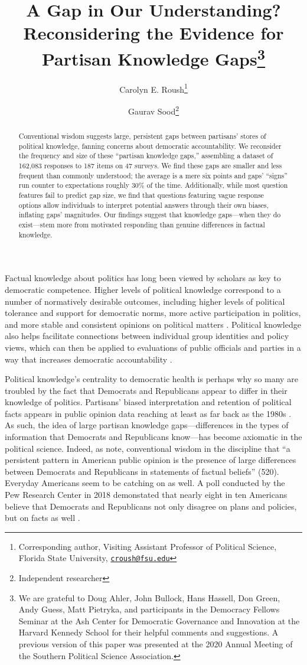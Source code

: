 \documentclass[12pt, letterpaper]{article}
\title{A Gap in Our Understanding? Reconsidering the Evidence for Partisan Knowledge Gaps\footnote{We are grateful to Doug Ahler, John Bullock, Hans Hassell, Don Green, Andy Guess, Matt Pietryka, and participants in the Democracy Fellows Seminar at the Ash Center for Democratic Governance and Innovation at the Harvard Kennedy School for their helpful comments and suggestions. A previous version of this paper was presented at the 2020 Annual Meeting of the Southern Political Science Association.}}
\author{Carolyn E. Roush\thanks{Corresponding author, Visiting Assistant Professor of Political Science, Florida State University, \href{mailto:croush@fsu.edu}{\texttt{croush@fsu.edu}}} \and Gaurav Sood\thanks{Independent researcher}}
\begin{document}
\maketitle
\thispagestyle{empty}

\begin{abstract}

\noindent Conventional wisdom suggests large, persistent gaps between partisans' stores of political knowledge, fanning concerns about democratic accountability. We reconsider the frequency and size of these ``partisan knowledge gaps,'' assembling a dataset of 162,083 responses to 187 items on 47 surveys. We find these gaps are smaller and less frequent than commonly understood; the average is a mere six points and gaps' ``signs'' run counter to expectations roughly 30\% of the time. Additionally, while most question features fail to predict gap size, we find that questions featuring vague response options allow individuals to interpret potential answers through their own biases, inflating gaps' magnitudes. Our findings suggest that knowledge gaps---when they do exist---stem more from motivated responding than genuine differences in factual knowledge.

\end{abstract}

\vspace{.2in}

\newpage

\doublespacing

Factual knowledge about politics has long been viewed by scholars as key to democratic competence. Higher levels of political knowledge correspond to a number of normatively desirable outcomes, including higher levels of political tolerance and support for democratic norms, more active participation in politics, and more stable and consistent opinions on political matters \citep{Converse1964,dellicarpini,galston_2001}. Political knowledge also helps facilitate connections between individual group identities and policy views, which can then be applied to evaluations of public officials and parties in a way that increases democratic accountability \citep{dellicarpini}.

Political knowledge's centrality to democratic health is perhaps why so many are troubled by the fact that Democrats and Republicans appear to differ in their knowledge of politics. Partisans' biased interpretation and retention of political facts appears in public opinion data reaching at least as far back as the 1980s \citep[e.g.,][]{bartels_2002,jerit2012partisan}. As such, the idea of large partisan knowledge gaps---differences in the types of information that Democrats and Republicans know---has become axiomatic in the political science. Indeed, as \citet{bullocketal_2015} note, conventional wisdom in the discipline that ``a persistent pattern in American public opinion is the presence of large differences between Democrats and Republicans in statements of factual beliefs'' (520). Everyday Americans seem to be catching on as well. A poll conducted by the Pew Research Center in 2018 demonstated that nearly eight in ten Americans believe that Democrats and Republicans not only disagree on plans and policies, but on facts as well \citep{pew2018disagree}. 
\end{document}
